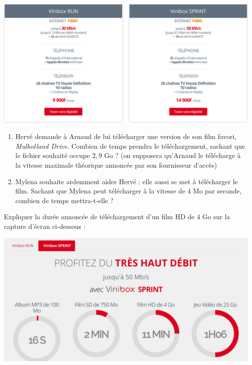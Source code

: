 \documentclass[a4paper]{article}
\begin{document}
\begin{center}
  \includegraphics[width=15cm]{evaluation_2_seconde_15_sujet_B_offres_vinibox_fibre.png}
\end{center}

\begin{enumerate}
  \item Hervé demande à Arnaud de lui télécharger une version de son film favori, \textit{Mulholland Drive}. Combien de temps prendra le téléchargement, sachant que le fichier souhaité occupe $2,9$ Go ? (on supposera qu'Arnaud le télécharge à la vitesse maximale théorique annoncée par son fournisseur d'accès)
  \item Mylena souhaite ardemment aider Hervé : elle aussi se met à télécharger le film. Sachant que Mylena peut télécharger à la vitesse de $4$ Mo par seconde, combien de temps mettra-t-elle ?
\end{enumerate}

\bigskip

\exo[2 points] Expliquer la durée annoncée de téléchargement d'un film HD de $4$ Go sur la capture d'écran ci-dessous :

\begin{center}
  \includegraphics[width=15cm]{evaluation_2_seconde_15_sujet_B_vini.png}
\end{center}

\dotfill{}
\end{document}
